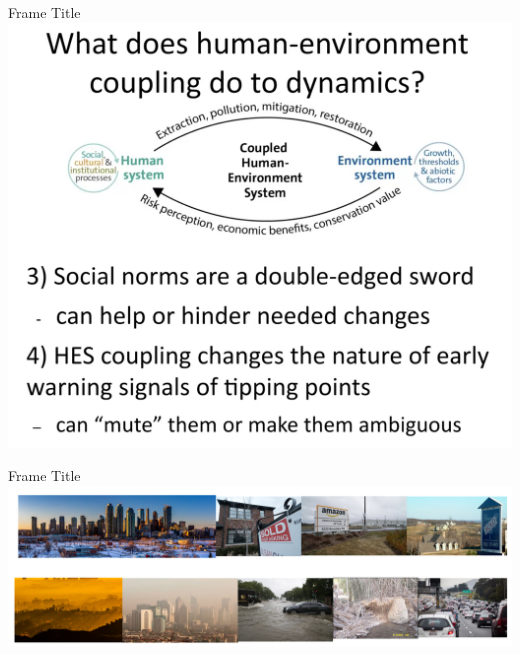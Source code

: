 \documentclass[notes=show]{beamer} %
\begin{document}
\begin{frame}{Frame Title}
\includegraphics[scale=.35]{fig/example_figures/feedbk-eqn-1.png}
\end{frame}
\begin{frame}{Frame Title}
\includegraphics[scale=.15]{fig/example_figures/pictures-ex-1.png}
\end{frame}
\end{document}
